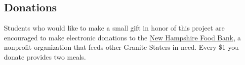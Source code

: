


\begin{center}\section*{Donations}\end{center}
\bigskip

Students who would like to make a small gift in honor of this project are
encouraged to make electronic donations to the \href{http://www.nhfoodbank.org/}{New Hampshire Food Bank}, a nonprofit organization that feeds other Granite Staters in need. Every \$1 you donate provides two meals.


